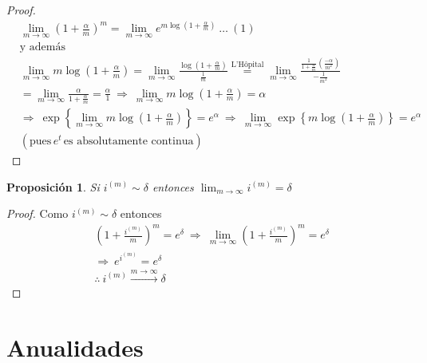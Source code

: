 \documentclass[
]{book}
\newtheorem{proposition}{Proposición}[chapter]
\theoremstyle{definition}
\theoremstyle{definition}
\theoremstyle{definition}
\theoremstyle{definition}
\theoremstyle{remark}
\begin{document}
\begin{proof}
\begin{align*}
&\lim_{m\to\infty} \left(1 + \frac{\alpha}{m} \right)^m =  \lim_{m\to\infty} e^{m\log\left(1 + \frac{\alpha}{m} \right)} \: \ldots \: (1)&\\
&\text{y además}&\\
&\lim_{m\to\infty}m\log\left(1 +\frac{\alpha}{m} \right) = \lim_{m\to\infty}\frac{\log\left(1 +\frac{\alpha}{m} \right)}{\frac{1}{m}} \mathrel{\stackrel{\scriptscriptstyle \text{L'Hôpital}}{=}}     \lim_{m \to \infty} \frac{\frac{1}{1+\frac{\alpha}{m}}\left(\frac{-\alpha}{m^2} \right) }{-\frac{1}{m^2}}&\\
&= \lim_{m \to \infty} \frac{\alpha}{1+\frac{\alpha}{m}} = \frac{\alpha}{1} \: \Longrightarrow \: \lim_{m\to\infty} m\log\left( 1 +\frac{\alpha}{m}\right) = \alpha &\\
&\Longrightarrow \: \exp{\left\lbrace\lim_{m\to\infty}m\log\left( 1 + \frac{\alpha}{m}\right)  \right\rbrace } = e^{\alpha} \: \Longrightarrow \: \lim_{m\to\infty}\exp{\left\lbrace m\log\left( 1 + \frac{\alpha}{m}\right)  \right\rbrace } = e^{\alpha}&\\
&(\text{pues}\, e^t \, \text{es absolutamente continua})&
\end{align*}
\end{proof}

\begin{proposition}
Si \(i^{(m)} \sim \delta\) entonces \(\lim_{m\to\infty} i^{(m)} = \delta\)
\end{proposition}

\begin{proof}
Como \(i^{(m)} \sim \delta\) entonces
\begin{align*}
&\left(1 + \frac{i^{(m)}}{m} \right)^m = e^{\delta} \: \Longrightarrow \: \lim_{m\to\infty} \left( 1 + \frac{i^{(m)}}{m}\right)^m = e^{\delta}\\
& \Longrightarrow \: e^{i^{(m)}} = e^{\delta}\\
& \therefore \: i^{(m)} \mathrel{\stackrel{\scriptscriptstyle m\rightarrow \infty}{\longrightarrow}} \delta
\end{align*}
\end{proof}

\hypertarget{anualidades}{%
\chapter{Anualidades}\label{anualidades}}

  
\end{document}
